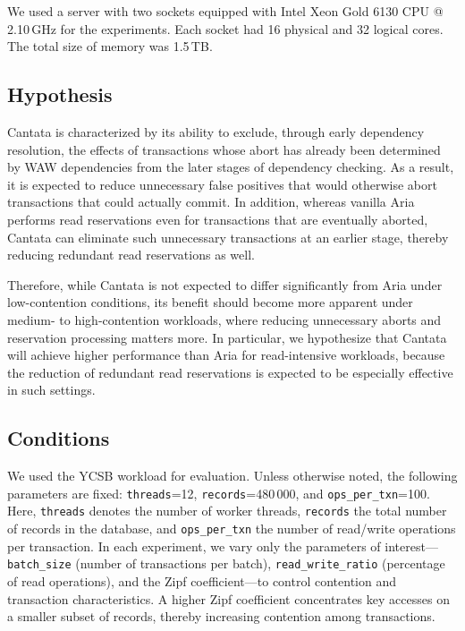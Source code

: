 \documentclass[english,preprint,JIP]{ipsj}
\begin{document}
We used a server with two sockets equipped with Intel Xeon Gold 6130 CPU @ 2.10\,GHz for the experiments. Each socket had 16 physical and 32 logical cores. The total size of memory was 1.5\,TB.
\subsection{Hypothesis}

Cantata is characterized by its ability to exclude, through early dependency resolution, the effects of transactions whose abort has already been determined by WAW dependencies from the later stages of dependency checking. As a result, it is expected to reduce unnecessary false positives that would otherwise abort transactions that could actually commit. In addition, whereas vanilla Aria performs read reservations even for transactions that are eventually aborted, Cantata can eliminate such unnecessary transactions at an earlier stage, thereby reducing redundant read reservations as well.

Therefore, while Cantata is not expected to differ significantly from Aria under low-contention conditions, its benefit should become more apparent under medium- to high-contention workloads, where reducing unnecessary aborts and reservation processing matters more. In particular, we hypothesize that Cantata will achieve higher performance than Aria for read-intensive workloads, because the reduction of redundant read reservations is expected to be especially effective in such settings.

\subsection{Conditions}

We used the YCSB workload for evaluation. Unless otherwise noted, the following parameters are fixed: \texttt{threads}=12, \texttt{records}=480\,000, and \texttt{ops\_per\_txn}=100. Here, \texttt{threads} denotes the number of worker threads, \texttt{records} the total number of records in the database, and \texttt{ops\_per\_txn} the number of read/write operations per transaction. In each experiment, we vary only the parameters of interest---\texttt{batch\_size} (number of transactions per batch), \texttt{read\_write\_ratio} (percentage of read operations), and the Zipf coefficient---to control contention and transaction characteristics. A higher Zipf coefficient concentrates key accesses on a smaller subset of records, thereby increasing contention among transactions.
\end{document}
